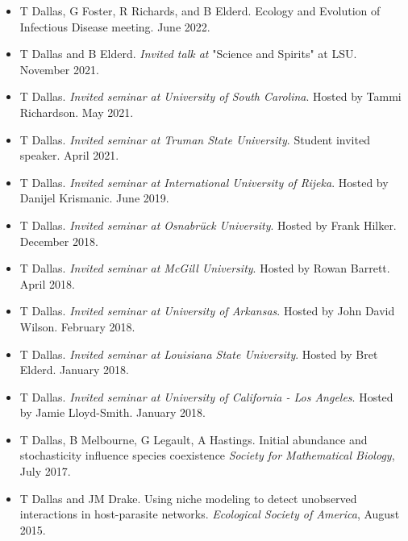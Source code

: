 \documentclass[]{CV}
\begin{document}
\begin{itemize}

\item {\mefont T Dallas}, G Foster, R Richards, and B Elderd. Ecology and Evolution of Infectious Disease meeting. June 2022.  

\item {\mefont T Dallas} and B Elderd. \textit{Invited talk at} "Science and Spirits" at LSU. November 2021. 

\item {\mefont T Dallas}. \textit{Invited seminar at University of South Carolina}. Hosted by Tammi Richardson. May 2021. 

\item {\mefont T Dallas}. \textit{Invited seminar at Truman State University}. Student invited speaker. April 2021. 

\item {\mefont T Dallas}. \textit{Invited seminar at International University of Rijeka}. Hosted by Danijel Krismanic. June 2019.

\item {\mefont T Dallas}. \textit{Invited seminar at Osnabr\"uck University}. Hosted by Frank Hilker. December 2018.

\item {\mefont T Dallas}. \textit{Invited seminar at McGill University}. Hosted by Rowan Barrett. April 2018. 

\item {\mefont T Dallas}. \textit{Invited seminar at University of Arkansas}. Hosted by John David Wilson. February 2018. 

\item {\mefont T Dallas}. \textit{Invited seminar at Louisiana State University}. Hosted by Bret Elderd. January 2018. 

\item {\mefont T Dallas}. \textit{Invited seminar at University of California - Los Angeles}. Hosted by Jamie Lloyd-Smith. January 2018. 

\item {\mefont T Dallas}, B Melbourne, G Legault, A Hastings. Initial abundance and stochasticity influence species coexistence \textit{Society for Mathematical Biology}, July 2017.

\item {\mefont T Dallas} and JM Drake. Using niche modeling to detect unobserved interactions in host-parasite networks. \textit{Ecological Society of America}, August 2015.


\end{itemize}
\end{document}
